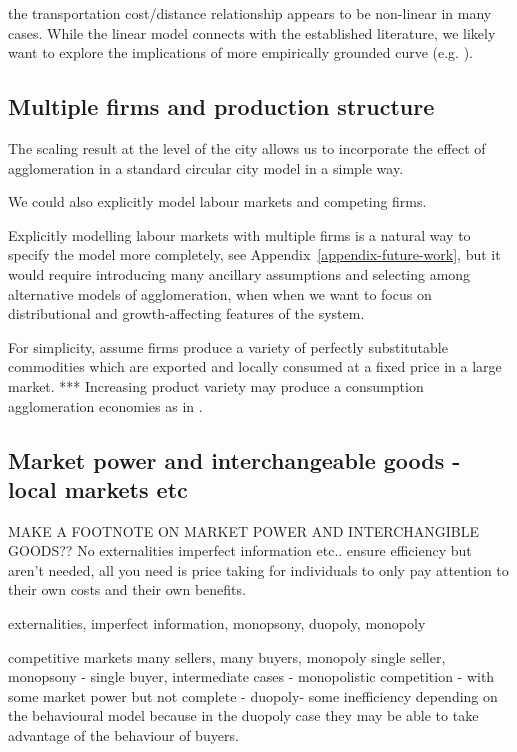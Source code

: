 the transportation cost/distance relationship appears to be non-linear in many cases. While the linear model connects with the established literature, we likely want to explore the implications of more empirically grounded curve (e.g. \cite{bertaudSpatialDistributionPopulation2003}).

\subsection{Multiple firms and production structure}
The scaling result at the level of the city allows us to incorporate the effect of agglomeration in a standard \gls{circular city} model in a simple way. 

We could also explicitly model labour markets and competing firms. 

Explicitly modelling labour markets with multiple firms is a natural way to specify the model more completely, see Appendix~\ref{appendix-future-work},  but it would require introducing many ancillary assumptions and selecting among alternative models of agglomeration, when when we want to focus on distributional and growth-affecting features of the system.

For simplicity, assume firms produce a variety of perfectly substitutable commodities which are exported and locally consumed at a fixed price in a large market. 
***  Increasing product variety may produce a consumption agglomeration economies as in \cite{fujitaSpatialEconomyCities1999}.

\subsection{Market power and interchangeable goods - local markets etc}
MAKE A FOOTNOTE ON MARKET POWER AND INTERCHANGIBLE GOODS??
No externalities imperfect information etc.. ensure efficiency but aren't needed, all you need is price taking for individuals to only pay attention to their own costs and their own benefits. 

\gls{externalities}, \gls{imperfect information}, \gls{monopsony}, \gls{duopoly}, \gls{monopoly}

competitive markets many sellers, many buyers, monopoly single seller, monopsony - single buyer, intermediate cases - monopolistic competition - with some market power but not complete - duopoly- some inefficiency depending on the behavioural model because in the duopoly case they may be able to take advantage of the behaviour of buyers.

